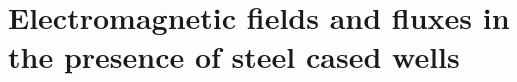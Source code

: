 
\chapter{Electromagnetic fields and fluxes in the presence of steel cased wells}
\label{ch:casing}
